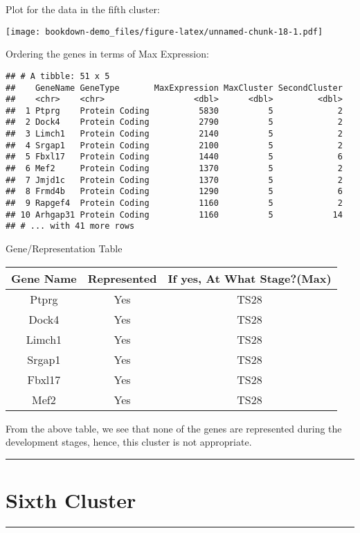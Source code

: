 \documentclass[
]{book}
\begin{document}
Plot for the data in the fifth cluster:

\texttt{[image: bookdown-demo\_files/figure-latex/unnamed-chunk-18-1.pdf]}

Ordering the genes in terms of Max Expression:

\begin{verbatim}
## # A tibble: 51 x 5
##    GeneName GeneType       MaxExpression MaxCluster SecondCluster
##    <chr>    <chr>                  <dbl>      <dbl>         <dbl>
##  1 Ptprg    Protein Coding          5830          5             2
##  2 Dock4    Protein Coding          2790          5             2
##  3 Limch1   Protein Coding          2140          5             2
##  4 Srgap1   Protein Coding          2100          5             2
##  5 Fbxl17   Protein Coding          1440          5             6
##  6 Mef2     Protein Coding          1370          5             2
##  7 Jmjd1c   Protein Coding          1370          5             2
##  8 Frmd4b   Protein Coding          1290          5             6
##  9 Rapgef4  Protein Coding          1160          5             2
## 10 Arhgap31 Protein Coding          1160          5            14
## # ... with 41 more rows
\end{verbatim}

Gene/Representation Table

\begin{longtable}[]{@{}ccc@{}}
\toprule
Gene Name & Represented & If yes, At What Stage?(Max)\tabularnewline
\midrule
\endhead
Ptprg & Yes & TS28\tabularnewline
Dock4 & Yes & TS28\tabularnewline
Limch1 & Yes & TS28\tabularnewline
Srgap1 & Yes & TS28\tabularnewline
Fbxl17 & Yes & TS28\tabularnewline
Mef2 & Yes & TS28\tabularnewline
\bottomrule
\end{longtable}

From the above table, we see that none of the genes are represented during the development stages, hence, this cluster is not appropriate.

\begin{center}\rule{0.5\linewidth}{0.5pt}\end{center}

\hypertarget{sixth-cluster}{%
\chapter{Sixth Cluster}\label{sixth-cluster}}

\begin{center}\rule{0.5\linewidth}{0.5pt}\end{center}
\end{document}
